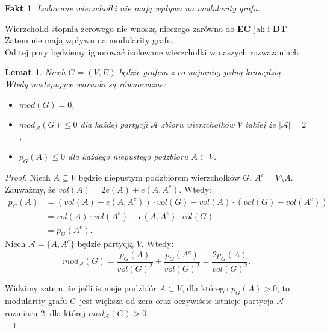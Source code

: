 \documentclass[letterpaper,12pt]{article}
\newtheorem{fact}{Fakt}
\newtheorem{lemma}{Lemat}
\begin{document}
  \begin{fact}
    Izolowane wierzchołki nie mają wpływu na modularity grafu.\\
  \end{fact}
  Wierzchołki stopnia zerowego nie wnoszą nieczego zarówno do \textbf{EC} jak i \textbf{DT}. Zatem nie mają wpływu na modularity grafu.\\

  Od tej pory będziemy ignorować izolowane wierzchołki w naszych rozważaniach.

  \begin{lemma}
    \label{mod_eq}
    Niech \(G = (V,E)\) będzie grafem z co najmniej jedną krawędzią. Wtedy nastepujące warunki są równoważne:
    \begin{itemize}
      \item \(mod(G) = 0\),
      \item \(mod_{\mathcal{A}}(G) \leq 0\) dla każdej partycji \(\mathcal{A}\) zbioru wierzchołków \(V\) takiej że \(|\mathcal{A}| = 2\),
      \item \(p_G(A) \leq 0\) dla każdego niepustego podzbioru \(A \subset V\).
    \end{itemize}
  \end{lemma}

  \begin{proof}
    Niech \(A \subseteq V\) będzie niepustym podzbiorem wierzchołków \(G\), \(A^c = V \setminus A\). Zauważmy, że \(vol(A) = 2e(A) + e(A, A^c)\). Wtedy:
    \begin{align*}
      p_G(A) &= \left(vol(A) - e(A, A^c)\right) \cdot vol(G) - vol(A) \cdot \left(vol(G)-vol(A^c)\right) \\
      &= vol(A) \cdot vol(A^c) - e(A, A^c) \cdot vol(G) \\
      &= p_G(A^c).
    \end{align*}
    Niech \(\mathcal{A} = \{A, A^c\}\) będzie partycją \(V\). Wtedy:
    \[mod_{\mathcal{A}}(G) = \frac{p_G(A)}{vol(G)^2} + \frac{p_G(A^c)}{vol(G)^2} = \frac{2p_G(A)}{vol(G)^2}.\]

  Widzimy zatem, że jeśli istnieje podzbiór \(A \subset V\), dla którego \(p_G(A) > 0\), to modularity grafu \(G\) jest większa od zera oraz oczywiście istnieje partycja \(\mathcal{A}\) rozmiaru 2, dla której \(mod_{\mathcal{A}}(G) > 0\).\\
  \end{proof}
\end{document}

